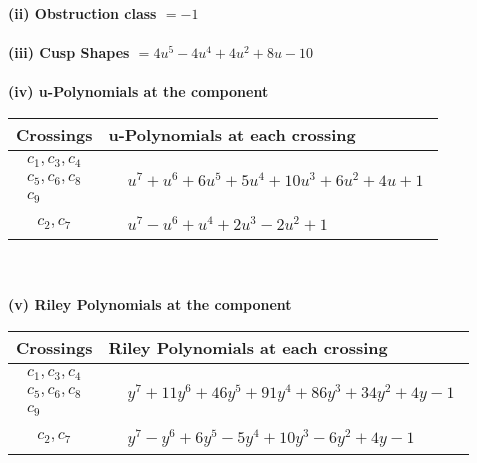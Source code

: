 \documentclass[1p]{elsarticle_modified}
\theoremstyle{definition}
\begin{document}
\flushleft \textbf{(ii) Obstruction class $= -1$}\\~\\
\flushleft \textbf{(iii) Cusp Shapes $= 4 u^5-4 u^4+4 u^2+8 u-10$}\\~\\
\newpage\renewcommand{\arraystretch}{1}
\flushleft \textbf{(iv) u-Polynomials at the component}\newline \\
\begin{tabular}{m{50pt}|m{274pt}}
Crossings & \hspace{64pt}u-Polynomials at each crossing \\
\hline $$\begin{aligned}c_{1},c_{3},c_{4}\\c_{5},c_{6},c_{8}\\c_{9}\end{aligned}$$&$\begin{aligned}
&u^7+u^6+6 u^5+5 u^4+10 u^3+6 u^2+4 u+1
\end{aligned}$\\
\hline $$\begin{aligned}c_{2},c_{7}\end{aligned}$$&$\begin{aligned}
&u^7- u^6+u^4+2 u^3-2 u^2+1
\end{aligned}$\\
\hline
\end{tabular}\\~\\
\newpage\renewcommand{\arraystretch}{1}
\flushleft \textbf{(v) Riley Polynomials at the component}\newline \\
\begin{tabular}{m{50pt}|m{274pt}}
Crossings & \hspace{64pt}Riley Polynomials at each crossing \\
\hline $$\begin{aligned}c_{1},c_{3},c_{4}\\c_{5},c_{6},c_{8}\\c_{9}\end{aligned}$$&$\begin{aligned}
&y^7+11 y^6+46 y^5+91 y^4+86 y^3+34 y^2+4 y-1
\end{aligned}$\\
\hline $$\begin{aligned}c_{2},c_{7}\end{aligned}$$&$\begin{aligned}
&y^7- y^6+6 y^5-5 y^4+10 y^3-6 y^2+4 y-1
\end{aligned}$\\
\hline
\end{tabular}\\~\\
\end{document}
